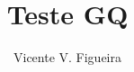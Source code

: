 \documentclass[twoside]{amsart}
\title{
Teste GQ
}
\author{
  Vicente V. Figueira
       }
\numberwithin{equation}{section}
\begin{document}
\maketitle



\nocite{*}









\newpage

\printbibliography
\end{document}

